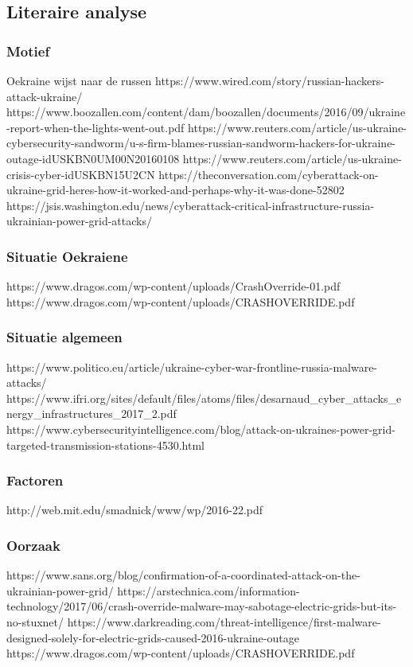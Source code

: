 \subsection{Literaire analyse}

\subsubsection{Motief}
Oekraine wijst naar de russen \cite{zetter2016GridHack}
https://www.wired.com/story/russian-hackers-attack-ukraine/
https://www.boozallen.com/content/dam/boozallen/documents/2016/09/ukraine-report-when-the-lights-went-out.pdf
https://www.reuters.com/article/us-ukraine-cybersecurity-sandworm/u-s-firm-blames-russian-sandworm-hackers-for-ukraine-outage-idUSKBN0UM00N20160108
https://www.reuters.com/article/us-ukraine-crisis-cyber-idUSKBN15U2CN
https://theconversation.com/cyberattack-on-ukraine-grid-heres-how-it-worked-and-perhaps-why-it-was-done-52802
https://jsis.washington.edu/news/cyberattack-critical-infrastructure-russia-ukrainian-power-grid-attacks/
\subsubsection{Situatie Oekraiene}
https://www.dragos.com/wp-content/uploads/CrashOverride-01.pdf
https://www.dragos.com/wp-content/uploads/CRASHOVERRIDE.pdf
\subsubsection{Situatie algemeen}
https://www.politico.eu/article/ukraine-cyber-war-frontline-russia-malware-attacks/
https://www.ifri.org/sites/default/files/atoms/files/desarnaud_cyber_attacks_energy_infrastructures_2017_2.pdf
https://www.cybersecurityintelligence.com/blog/attack-on-ukraines-power-grid-targeted-transmission-stations-4530.html

\subsubsection{Factoren}
http://web.mit.edu/smadnick/www/wp/2016-22.pdf
\subsubsection{Oorzaak}
https://www.sans.org/blog/confirmation-of-a-coordinated-attack-on-the-ukrainian-power-grid/
https://arstechnica.com/information-technology/2017/06/crash-override-malware-may-sabotage-electric-grids-but-its-no-stuxnet/
https://www.darkreading.com/threat-intelligence/first-malware-designed-solely-for-electric-grids-caused-2016-ukraine-outage
https://www.dragos.com/wp-content/uploads/CRASHOVERRIDE.pdf
